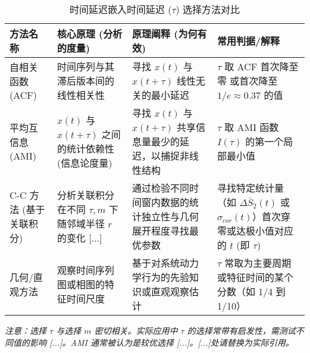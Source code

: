\begin{table}[h!] %
    \centering %
    \caption{时间延迟嵌入时间延迟 ($\tau$) 选择方法对比} %
    \label{tab:time_delay_tau_methods_compare} %
    \begin{tabular}{
      >{\raggedright\arraybackslash}m{3cm}    %
      >{\raggedright\arraybackslash}m{4.5cm}  %
      >{\raggedright\arraybackslash}m{5cm}   %
      >{\raggedright\arraybackslash}m{4cm}    %
    }
    \toprule %
    \textbf{方法名称} & \textbf{核心原理} (分析的度量) & \textbf{原理阐释} (为何有效) & \textbf{常用判据/解释} \\
    \midrule %
    
    自相关函数 (ACF) & 时间序列与其滞后版本间的线性相关性  & 寻找 $x(t)$ 与 $x(t+\tau)$ 线性无关的最小延迟  & $\tau$ 取 ACF 首次降至零  或首次降至 $1/e \approx 0.37$  的值 \\
    \addlinespace %
    
    平均互信息 (AMI) & $x(t)$ 与 $x(t+\tau)$ 之间的统计依赖性 (信息论度量)  & 寻找 $x(t)$ 与 $x(t+\tau)$ 共享信息量最少的延迟，以捕捉非线性结构  & $\tau$ 取 AMI 函数 $I(\tau)$ 的第一个局部最小值  \\
    \addlinespace
    
    C-C 方法 (基于关联积分) & 分析关联积分在不同 $\tau, m$ 下随邻域半径 $r$ 的变化 [...] & 通过检验不同时间窗内数据的统计独立性与几何展开程度寻找最优参数  & 寻找特定统计量（如 $\Delta \bar{S}_2(t)$ 或 $\sigma_{cor}(t)$）首次穿零或达极小值对应的 $t$ (即 $\tau$)  \\
    \addlinespace
    
    几何/直观方法 & 观察时间序列图或相图的特征时间尺度  & 基于对系统动力学行为的先验知识或直观观察估计 & $\tau$ 常取为主要周期或特征时间的某个分数（如 1/4 到 1/10）\\
    
    \bottomrule %
    \end{tabular}
    \par %
    \vspace{0.5cm} %
    \textit{注意：选择 $\tau$ 与选择 $m$ 密切相关。实际应用中 $\tau$ 的选择常带有启发性，需测试不同值的影响 [...]。AMI 通常被认为是较优选择 [...]。[...]处请替换为实际引用。}
    \end{table}

